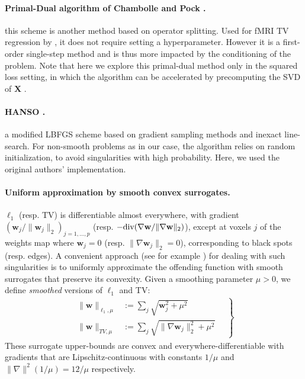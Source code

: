 \paragraph{Primal-Dual algorithm of Chambolle and Pock  \citep{chambolle2010}.}
this scheme is another method based on operator splitting.
Used for fMRI TV regression by  \citep{gramfort-etal:2013a},
it does not require setting a hyperparameter.  %
However it is a first-order single-step method and is thus more impacted by the
conditioning of the problem. Note that here we explore this primal-dual
method only in the squared loss setting, in which the algorithm can be accelerated by
precomputing the SVD of $\mathbf{X}$  \citep{gramfort-etal:2013a}
.

\paragraph{HANSO  \citep{lewis2008}.}
a modified LBFGS scheme based on gradient 
sampling methods  \citep{burke2005} and inexact
line-search. For non-smooth problems as in our case, the algorithm relies on
random initialization, to avoid singularities with high probability. 
Here, we used the original authors' implementation.

\paragraph{Uniform approximation by smooth convex surrogates.}
$\ell_{1}$ (resp. TV) is differentiable almost everywhere,
with gradient $\left(\mathbf{w}_j/\|\textbf{w}_j\|_2\right)_{j=1,\ldots,p}$ (resp. $-\textrm{div} (\nabla \mathbf{w}/\|\nabla \mathbf{w}\|_2)$), except at voxels $j$ of the weights map where
$\mathbf{w}_j = 0$ (resp. $\|\nabla \mathbf{w}_j\|_2 =
0$), corresponding to black spots (resp. edges).  A convenient
approach (see for example  \citep{NESTA, nesterov2005a, nesterov2005b,
  beck2012}) for dealing with such singularities is to uniformly
approximate the offending function with smooth surrogates that
preserve its convexity. Given  %
a smoothing parameter $\mu > 0$, we define \emph{smoothed} versions
of $\ell_1$ and TV:
%
\begin{eqnarray}
  \left.
  \begin{aligned}
    \|\mathbf{w}\|_{\ell_{1},\mu} &:= \sum_j
    \sqrt{\mathbf{w}_j^2 + \mu^2} \quad\\
    \|\mathbf{w}\|_{TV, \mu} &:=
    \sum_{j} \sqrt{\|\nabla \mathbf{w}_j\|_{2}^2 +
    \mu^2} \quad
    \end{aligned}
    \right\}
\end{eqnarray}
These surrogate upper-bounds are convex and everywhere-differentiable
with gradients that are Lipschitz-continuous with constants $1/\mu$ and
$\|\nabla\|^2(1/\mu) = 12 / \mu$ respectively.

